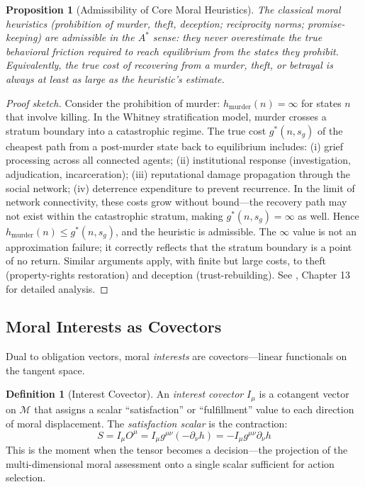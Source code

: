 \documentclass[12pt,letterpaper]{article}
\newtheorem{proposition}[theorem]{Proposition}
\theoremstyle{definition}
\newtheorem{definition}[theorem]{Definition}
\theoremstyle{remark}
\newcommand{\M}{\mathcal{M}}
\begin{document}
\begin{proposition}[Admissibility of Core Moral Heuristics]
\label{prop:admissibility}
The classical moral heuristics (prohibition of murder, theft, deception; reciprocity norms; promise-keeping) are admissible in the $A^*$ sense: they never overestimate the true behavioral friction required to reach equilibrium from the states they prohibit. Equivalently, the true cost of recovering from a murder, theft, or betrayal is always at least as large as the heuristic's estimate.
\end{proposition}

\begin{proof}[Proof sketch]
Consider the prohibition of murder: $h_{\text{murder}}(n) = \infty$ for states $n$ that involve killing. In the Whitney stratification model, murder crosses a stratum boundary into a catastrophic regime. The true cost $g^*(n, s_g)$ of the cheapest path from a post-murder state back to equilibrium includes: (i) grief processing across all connected agents; (ii) institutional response (investigation, adjudication, incarceration); (iii) reputational damage propagation through the social network; (iv) deterrence expenditure to prevent recurrence. In the limit of network connectivity, these costs grow without bound---the recovery path may not exist within the catastrophic stratum, making $g^*(n, s_g) = \infty$ as well. Hence $h_{\text{murder}}(n) \leq g^*(n, s_g)$, and the heuristic is admissible. The $\infty$ value is not an approximation failure; it correctly reflects that the stratum boundary is a point of no return. Similar arguments apply, with finite but large costs, to theft (property-rights restoration) and deception (trust-rebuilding). See \cite{bond2026geometric}, Chapter 13 for detailed analysis.
\end{proof}

\subsection{Moral Interests as Covectors}

Dual to obligation vectors, moral \emph{interests} are covectors---linear functionals on the tangent space.

\begin{definition}[Interest Covector]
\label{def:interest}
An \emph{interest covector} $I_\mu$ is a cotangent vector on $\M$ that assigns a scalar ``satisfaction'' or ``fulfillment'' value to each direction of moral displacement. The \emph{satisfaction scalar} is the contraction:
\begin{equation}
S = I_\mu O^\mu = I_\mu g^{\mu\nu} (-\partial_\nu h) = -I_\mu g^{\mu\nu} \partial_\nu h
\label{eq:satisfaction}
\end{equation}
This is the moment when the tensor becomes a decision---the projection of the multi-dimensional moral assessment onto a single scalar sufficient for action selection.
\end{definition}
\end{document}

